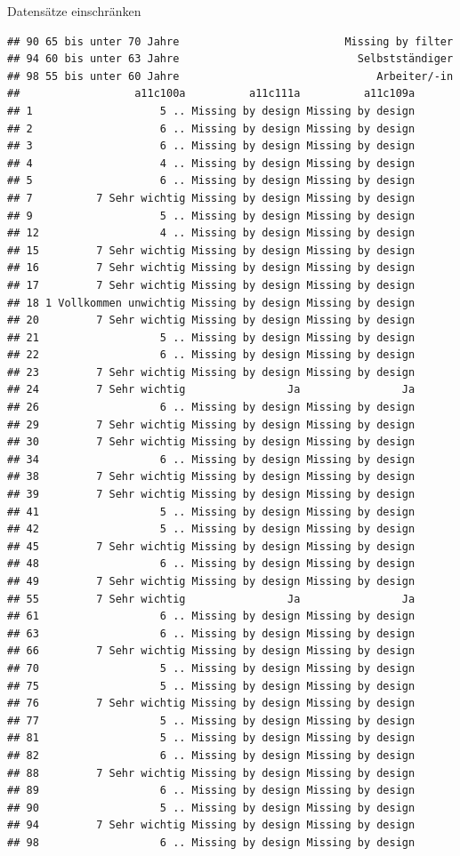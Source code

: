 \documentclass[ignorenonframetext,]{beamer}
\begin{document}
\begin{frame}[fragile]{Datensätze einschränken}
\begin{verbatim}
## 90 65 bis unter 70 Jahre                          Missing by filter
## 94 60 bis unter 63 Jahre                            Selbstständiger
## 98 55 bis unter 60 Jahre                               Arbeiter/-in
##                  a11c100a          a11c111a          a11c109a
## 1                    5 .. Missing by design Missing by design
## 2                    6 .. Missing by design Missing by design
## 3                    6 .. Missing by design Missing by design
## 4                    4 .. Missing by design Missing by design
## 5                    6 .. Missing by design Missing by design
## 7          7 Sehr wichtig Missing by design Missing by design
## 9                    5 .. Missing by design Missing by design
## 12                   4 .. Missing by design Missing by design
## 15         7 Sehr wichtig Missing by design Missing by design
## 16         7 Sehr wichtig Missing by design Missing by design
## 17         7 Sehr wichtig Missing by design Missing by design
## 18 1 Vollkommen unwichtig Missing by design Missing by design
## 20         7 Sehr wichtig Missing by design Missing by design
## 21                   5 .. Missing by design Missing by design
## 22                   6 .. Missing by design Missing by design
## 23         7 Sehr wichtig Missing by design Missing by design
## 24         7 Sehr wichtig                Ja                Ja
## 26                   6 .. Missing by design Missing by design
## 29         7 Sehr wichtig Missing by design Missing by design
## 30         7 Sehr wichtig Missing by design Missing by design
## 34                   6 .. Missing by design Missing by design
## 38         7 Sehr wichtig Missing by design Missing by design
## 39         7 Sehr wichtig Missing by design Missing by design
## 41                   5 .. Missing by design Missing by design
## 42                   5 .. Missing by design Missing by design
## 45         7 Sehr wichtig Missing by design Missing by design
## 48                   6 .. Missing by design Missing by design
## 49         7 Sehr wichtig Missing by design Missing by design
## 55         7 Sehr wichtig                Ja                Ja
## 61                   6 .. Missing by design Missing by design
## 63                   6 .. Missing by design Missing by design
## 66         7 Sehr wichtig Missing by design Missing by design
## 70                   5 .. Missing by design Missing by design
## 75                   5 .. Missing by design Missing by design
## 76         7 Sehr wichtig Missing by design Missing by design
## 77                   5 .. Missing by design Missing by design
## 81                   5 .. Missing by design Missing by design
## 82                   6 .. Missing by design Missing by design
## 88         7 Sehr wichtig Missing by design Missing by design
## 89                   6 .. Missing by design Missing by design
## 90                   5 .. Missing by design Missing by design
## 94         7 Sehr wichtig Missing by design Missing by design
## 98                   6 .. Missing by design Missing by design
\end{verbatim}


\end{frame}
\end{document}
